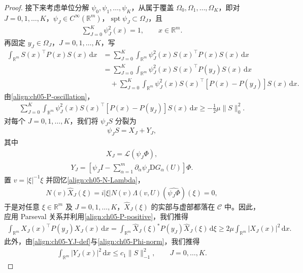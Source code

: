\documentclass[../../main.tex]{subfiles}
\begin{document}
\begin{proof}
接下来考虑单位分解 $\psi_{0},\psi_{1},\ldots,\psi_{K}$，从属于覆盖 $\Omega_{0},\Omega_{1},\ldots,\Omega_{K}$，即对 $J=0,1,\ldots,K$，$\psi_{J}\in C^{\infty}(\mathbb{R}^{m})$，$\operatorname{spt}\psi_{J}\subset\Omega_{J}$，且
\begin{align}
\sum_{J=0}^{K}\psi_{J}^{2}(x)=1,\qquad x\in\mathbb{R}^{m}.\label{align:ch05-partition}
\end{align}
再固定 $y_{J}\in\Omega_{J}$，$J=0,1,\ldots,K$，写
\begin{align}
\int_{\mathbb{R}^{m}}S(x)^{\top}P(x)S(x)\,\mathrm{d}x
&=\sum_{J=0}^{K}\int_{\mathbb{R}^{m}}\psi_{J}^{2}(x)S(x)^{\top}P(x)S(x)\,\mathrm{d}x\nonumber\\
&=\sum_{J=0}^{K}\int_{\mathbb{R}^{m}}\psi_{J}^{2}(x)S(x)^{\top}P(y_{J})S(x)\,\mathrm{d}x\nonumber\\
&\quad+\sum_{J=0}^{K}\int_{\mathbb{R}^{m}}\psi_{J}^{2}(x)S(x)^{\top}[P(x)-P(y_{J})]S(x)\,\mathrm{d}x.\label{align:ch05-P-split}
\end{align}
由\eqref{align:ch05-P-oscillation}，
\begin{align}
\sum_{J=0}^{K}\int_{\mathbb{R}^{m}}\psi_{J}^{2}(x)S(x)^{\top}[P(x)-P(y_{J})]S(x)\,\mathrm{d}x\geqslant-\frac{1}{2}\mu\|S\|_{0}^{2}.\label{align:ch05-P-oscillation-est}
\end{align}
对每个 $J=0,1,\ldots,K$，我们将 $\psi_{J}S$ 分裂为
\begin{align}
\psi_{J}S=X_{J}+Y_{J},\label{align:ch05-XY-split}
\end{align}
其中
\begin{align}
X_{J}=\mathscr{L}(\psi_{J}\Phi),\label{align:ch05-XJ-def}
\end{align}
\begin{align}
Y_{J}=\left[\psi_{J}I-\sum_{\alpha=1}^{m}\partial_{\alpha}\psi_{J}\mathrm{D}G_{\alpha}(U)\right]\Phi.\label{align:ch05-YJ-def}
\end{align}
置 $v=|\xi|^{-1}\xi$ 并回忆\eqref{align:ch05-N-Lambda}，
\begin{align}
N(v)\hat{X}_{J}(\xi)=i|\xi|N(v)\Lambda(v,U)(\widehat{\psi_{J}\Phi})(\xi)=0,\label{align:ch05-XJ-kernel}
\end{align}
于是对任意 $\xi\in\mathbb{R}^{m}$ 及 $J=0,1,\ldots,K$，$\hat{X}_{J}(\xi)$ 的实部与虚部都落在 $\mathscr{C}$ 中。因此，应用 Parseval 关系并利用\eqref{align:ch05-P-positive}，我们推得
\begin{align}
\int_{\mathbb{R}^{m}}X_{J}(x)^{\top}P(y_{J})X_{J}(x)\,\mathrm{d}x=\int_{\mathbb{R}^{m}}\hat{X}_{J}(\xi)^{*}P(y_{J})\hat{X}_{J}(\xi)\,\mathrm{d}\xi\geqslant 2\mu\int_{\mathbb{R}^{m}}|X_{J}(x)|^{2}\,\mathrm{d}x.\label{align:ch05-XJ-positive}
\end{align}
此外，由\eqref{align:ch05-YJ-def}与\eqref{align:ch05-Phi-norm}，我们推得
\begin{align}
\int_{\mathbb{R}^{m}}|Y_{J}(x)|^{2}\,\mathrm{d}x\leqslant c_{1}\|S\|_{-1}^{2},\qquad J=0,\ldots,K.\label{align:ch05-YJ-bound}
\end{align}


\end{proof}
\end{document}
